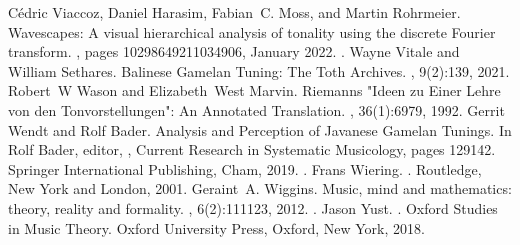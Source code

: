 \documentclass[letterpaper,10pt,english]{sphinxmanual}
\begin{document}
\begin{sphinxthebibliography}{10}
\sphinxAtStartPar
Cédric Viaccoz, Daniel Harasim, Fabian C. Moss, and Martin Rohrmeier. Wavescapes: A visual hierarchical analysis of tonality using the discrete Fourier transform. , pages 10298649211034906, January 2022. .
\sphinxAtStartPar
Wayne Vitale and William Sethares. Balinese Gamelan Tuning: The Toth Archives. , 9(2):1\textendash{}39, 2021.
\sphinxAtStartPar
Robert W Wason and Elizabeth West Marvin. Riemann\textquotesingle{}s "Ideen zu Einer \textquotesingle{}Lehre von den Tonvorstellungen\textquotesingle{}": An Annotated Translation. , 36(1):69\textendash{}79, 1992.
\sphinxAtStartPar
Gerrit Wendt and Rolf Bader. Analysis and Perception of Javanese Gamelan Tunings. In Rolf Bader, editor, , Current Research in Systematic Musicology, pages 129\textendash{}142. Springer International Publishing, Cham, 2019. .
\sphinxAtStartPar
Frans Wiering. . Routledge, New York and London, 2001.
\sphinxAtStartPar
Geraint A. Wiggins. Music, mind and mathematics: theory, reality and formality. , 6(2):111\textendash{}123, 2012. .
\sphinxAtStartPar
Jason Yust. . Oxford Studies in Music Theory. Oxford University Press, Oxford, New York, 2018.
\end{sphinxthebibliography}


\renewcommand{\indexname}{Python Module Index}
\begin{sphinxtheindex}
\let\bigletter\sphinxstyleindexlettergroup
\bigletter{g}
\item\relax{}
\end{sphinxtheindex}

\renewcommand{\indexname}{Index}
\printindex
\end{document}
